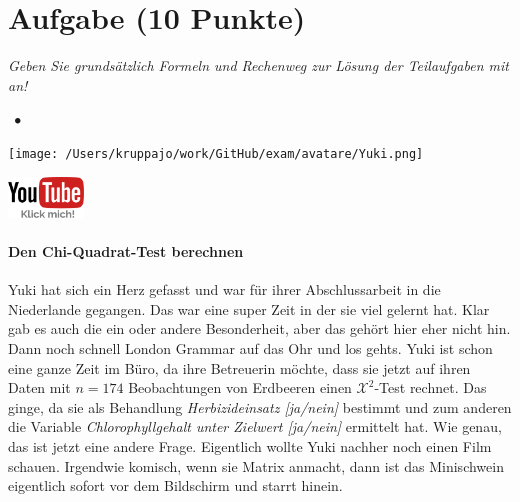 \documentclass[a4paper, 9pt]{scrartcl}\usepackage[]{graphicx}\usepackage[]{xcolor}
\begin{document}
\section{Aufgabe \hfill (10 Punkte)}

\textit{Geben Sie grundsätzlich Formeln und Rechenweg zur Lösung der Teilaufgaben mit an!} \\[1Ex]
 

 
\ifcollection
\begin{flushright}
\tiny\vspace{-3Ex}
\textbf{\examinhaltstart}
\exammodulestat $\;\bullet$
\exammodulestatbbv 
\vspace{-4Ex}
\end{flushright}
\begin{minipage}[t]{0.5\textwidth}
\texttt{[image: /Users/kruppajo/work/GitHub/exam/avatare/Yuki.png]}
\end{minipage}
\begin{minipage}[t]{0.5\textwidth}
\hfill
\href{https://youtu.be/1y_X_TI-Gm4}{\includegraphics[width = 2cm]{img/youtube}}
\end{minipage}
\vspace{-3Ex}
\fi



\ifcollection
\paragraph{Den Chi-Quadrat-Test berechnen}
\fi

Yuki hat sich ein Herz gefasst und war für ihrer Abschlussarbeit in die Niederlande gegangen. Das war eine super Zeit in der sie viel gelernt hat. Klar gab es auch die ein oder andere Besonderheit, aber das gehört hier eher nicht hin. Dann noch schnell London Grammar auf das Ohr und los gehts. Yuki ist schon eine ganze Zeit im Büro, da ihre Betreuerin möchte, dass sie jetzt auf ihren Daten mit $n = 174$ Beobachtungen von Erdbeeren einen $\mathcal{X}^2$-Test rechnet. Das ginge, da sie als Behandlung \textit{Herbizideinsatz [ja/nein]} bestimmt und zum anderen die Variable \textit{Chlorophyllgehalt unter Zielwert [ja/nein]} ermittelt hat. Wie genau, das ist jetzt eine andere Frage. Eigentlich wollte Yuki nachher noch einen Film schauen. Irgendwie komisch, wenn sie Matrix anmacht, dann ist das Minischwein eigentlich sofort vor dem Bildschirm und starrt hinein.
\end{document}
